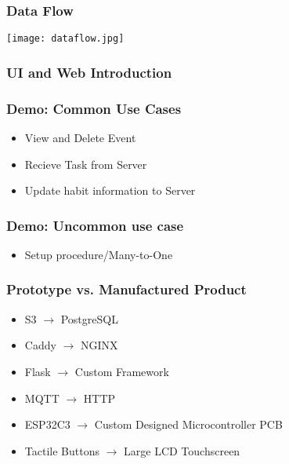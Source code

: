 \documentclass{beamer}
\begin{document}
\frame{\titlepage}

\begin{frame}
  \frametitle{Data Flow}
    \begin{center}
        \texttt{[image: dataflow.jpg]}
    \end{center}
\end{frame}

\begin{frame}
  \frametitle{UI and Web Introduction}
\end{frame}

\begin{frame}
  \frametitle{Demo: Common Use Cases}
  \begin{itemize}
    \item View and Delete Event
    \item Recieve Task from Server
    \item Update habit information to Server
  \end{itemize}
\end{frame}

\begin{frame}
  \frametitle{Demo: Uncommon use case}
  \begin{itemize}
    \item Setup procedure/Many-to-One
  \end{itemize}
\end{frame}

\begin{frame}
  \frametitle{Prototype vs. Manufactured Product}
  \begin{itemize}
    \item S3 \(\rightarrow\) PostgreSQL
    \item Caddy \(\rightarrow\) NGINX
    \item Flask \(\rightarrow\) Custom Framework
    \item MQTT \(\rightarrow\) HTTP
    \item ESP32C3 \(\rightarrow\) Custom Designed Microcontroller PCB
    \item Tactile Buttons \(\rightarrow\) Large LCD Touchscreen
  \end{itemize}
\end{frame}
\end{document}
